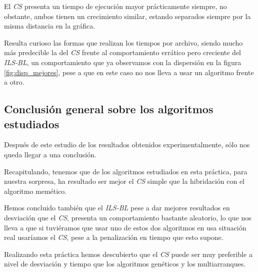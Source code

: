 El \textit{CS} presenta un tiempo de ejecución mayor prácticamente siempre, no obstante, ambos tienen un crecimiento similar, estando separados siempre por la misma distancia en la gráfica.

Resulta curioso las formas que realizan los tiempos por archivo, siendo mucho más predecible la del \textit{CS} frente al comportamiento errático pero creciente del \textit{ILS-BL}, un comportamiento que ya observamos con la dispersión en la figura \ref{fig:disp_mejores}, pese a que en este caso no nos lleva a usar un algoritmo frente a otro.

\newpage

\subsection{Conclusión general sobre los algoritmos estudiados}

Después de este estudio de los resultados obtenidos experimentalmente, sólo nos queda llegar a una conclusión.

Recapitulando, tenemos que de los algoritmos estudiados en esta práctica, para nuestra sorpresa, ha resultado ser mejor el \textit{CS} simple que la hibridación con el algoritmo memético.

Hemos concluido también que el \textit{ILS-BL} pese a dar mejores resultados en desviación que el \textit{CS}, presenta un comportamiento bastante aleatorio, lo que nos lleva a que si tuviéramos que usar uno de estos dos algoritmos en usa situación real usaríamos el \textit{CS}, pese a la penalización en tiempo que esto supone.

Realizando esta práctica hemos descubierto que el \textit{CS} puede ser muy preferible a nivel de desviación y tiempo que los algoritmos genéticos y los multiarranques.








